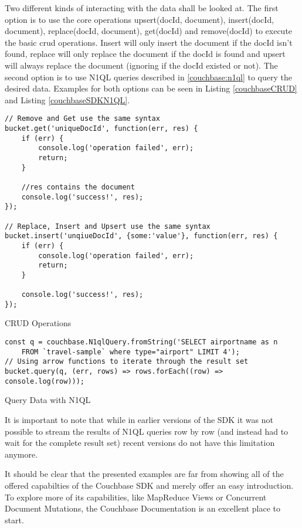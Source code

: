 Two different kinds of interacting with the data shall be looked at. The first option is to use the core operations upsert(docId, document), insert(docId, document), replace(docId, document), get(docId) and remove(docId) to execute the basic \gls{crud} operations. Insert will only insert the document if the docId isn't found, replace will only replace the document if the docId is found and upsert will always replace the document (ignoring if the docId existed or not). The second option is to use N1QL queries described in \autoref{couchbase:n1ql} to query the desired data. Examples for both options can be seen in Listing \ref{couchbaseCRUD} and Listing \ref{couchbaseSDKN1QL}.

\begin{listing}[ht]
\begin{verbatim}
// Remove and Get use the same syntax
bucket.get('uniqueDocId', function(err, res) {
    if (err) {
        console.log('operation failed', err);
        return;
    }
    
    //res contains the document
    console.log('success!', res);
});

// Replace, Insert and Upsert use the same syntax
bucket.insert('unqiueDocId', {some:'value'}, function(err, res) {
    if (err) {
        console.log('operation failed', err);
        return;
    }

    console.log('success!', res);
});
\end{verbatim}
\caption{CRUD Operations}
\label{couchbaseCRUD}
\end{listing}

\begin{listing}[ht]
\begin{verbatim}
const q = couchbase.N1qlQuery.fromString('SELECT airportname as n
    FROM `travel-sample` where type="airport" LIMIT 4');
// Using arrow functions to iterate through the result set
bucket.query(q, (err, rows) => rows.forEach((row) => console.log(row)));
\end{verbatim}
\caption{Query Data with N1QL}
\label{couchbaseSDKN1QL}
\end{listing}

It is important to note that while in earlier versions of the SDK it was not possible to stream the results of N1QL queries row by row (and instead had to wait for the complete result set) recent versions do not have this limitation anymore.

It should be clear that the presented examples are far from showing all of the offered capabilties of the Couchbase SDK and merely offer an easy introduction. To explore more of its capabilities, like MapReduce Views or Concurrent Document Mutations, the Couchbase Documentation is an excellent place to start.

